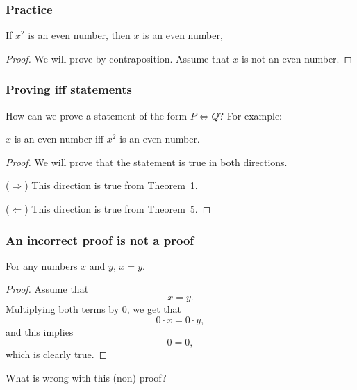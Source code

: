 \begin{frame}\frametitle{Practice}
  \begin{theorem}
    If $x^2$ is an even number, then $x$ is an even number, 
  \end{theorem} \pause
  \begin{proof}
    We will prove by contraposition.  
    Assume that $x$ is not an even number.

    \vspace{1.5in}
  \end{proof}
\end{frame}

\begin{frame}\frametitle{Proving iff statements}
  How can we prove a statement of the form $P\Leftrightarrow Q$?  For example:
  \begin{theorem}
    $x$ is an even number iff $x^2$ is an even number.
  \end{theorem} \pause
  \begin{proof}
    We will prove that the statement is true in both directions.
    
    ($\Rightarrow$) This direction is true from Theorem~1.

    ($\Leftarrow$) This direction is true from Theorem~5.
  \end{proof}
\end{frame}

\begin{frame}\frametitle{An incorrect proof is not a proof}
  \begin{theorem}
    For any numbers $x$ and $y$, $x = y$.
  \end{theorem}
  \pause

  \begin{proof}
    Assume that
    \[ x = y. \] \pause
    Multiplying both terms by 0, we get that
    \[ 0\cdot x = 0\cdot y, \] \pause
    and this implies
    \[ 0 = 0, \]
    which is clearly true.
  \end{proof}

  \pause

  What is wrong with this (non) proof?
\end{frame}

